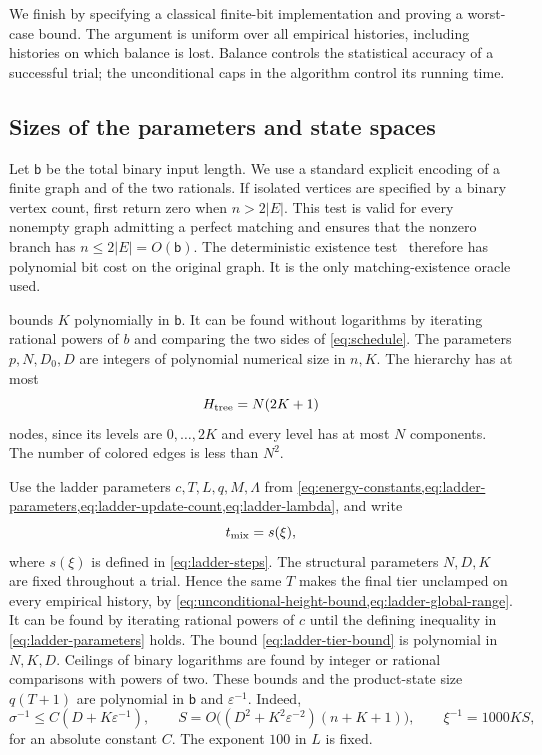 \documentclass[11pt]{article}
\theoremstyle{definition}
\theoremstyle{remark}
\newcommand{\eps}{\varepsilon}
\numberwithin{equation}{section}
\begin{document}
We finish by specifying a classical finite-bit implementation and proving
a worst-case bound. The argument is uniform over all empirical histories,
including histories on which balance is lost. Balance controls the
statistical accuracy of a successful trial; the unconditional caps in
the algorithm control its running time.

\subsection{Sizes of the parameters and state spaces}
Let $\mathsf b$ be the total binary input length. We use a standard
explicit encoding of a finite graph and of the two rationals. If isolated
vertices are specified by a binary vertex count, first return zero when
$n>2|E|$. This test is valid for every nonempty graph admitting a perfect
matching and ensures that the nonzero branch has $n\le2|E|=O(\mathsf b)$.
The deterministic existence test~\cite{Edmonds1965} therefore has
polynomial bit cost on the original graph. It is the only
matching-existence oracle used.

 bounds $K$ polynomially in $\mathsf b$.
It can be found without logarithms by iterating rational powers of $b$
and comparing the two sides of \eqref{eq:schedule}. The parameters
$p,N,D_0,D$ are integers of polynomial numerical size in $n,K$.
The hierarchy has at most
\begin{equation}\label{eq:hierarchy-size}
 H_{\rm tree}=N(2K+1)
\end{equation}
nodes, since its levels are $0,\ldots,2K$ and every level has at most
$N$ components. The number of colored edges is less than $N^2$.

Use the ladder parameters $c,T,L,q,M,\Lambda$ from
\cref{eq:energy-constants,eq:ladder-parameters,eq:ladder-update-count,eq:ladder-lambda}, and write
\[
 t_{\rm mix}=s(\xi),
\]
where $s(\xi)$ is defined in \eqref{eq:ladder-steps}. The structural
parameters $N,D,K$ are fixed throughout a trial. Hence the same $T$
makes the final tier unclamped on every empirical history, by
\cref{eq:unconditional-height-bound,eq:ladder-global-range}.
It can be found by iterating rational powers of $c$ until the defining
inequality in \eqref{eq:ladder-parameters} holds. The bound
\eqref{eq:ladder-tier-bound} is polynomial in $N,K,D$.
Ceilings of binary logarithms are found by integer or rational
comparisons with powers of two.
These bounds and the product-state size
$q(T+1)$ are polynomial in $\mathsf b$ and $\eps^{-1}$.
Indeed,
\[
 \sigma^{-1}\le C(D+K\eps^{-1}),\qquad
 S=O\bigl((D^2+K^2\eps^{-2})(n+K+1)\bigr),\qquad
 \xi^{-1}=1000KS,
\]
for an absolute constant $C$. The exponent $100$ in $L$ is fixed.
\end{document}
